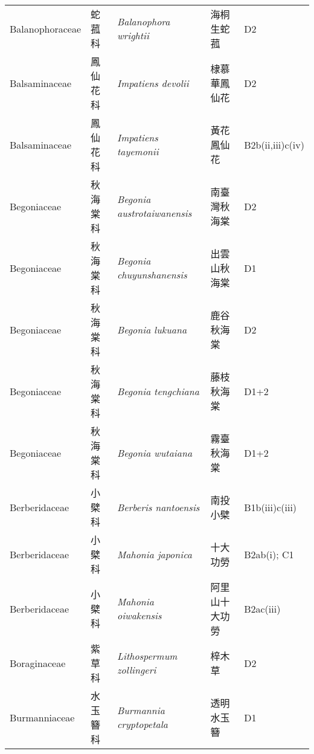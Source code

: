 {\begin{longtable}{p{2.5cm}p{2.5cm}p{4.5cm}p{2.5cm}p{3cm}}
    Balanophoraceae & 蛇菰科 & \textit{Balanophora wrightii}  & 海桐生蛇菰 & D2 \index{Balanophora@\textit{Balanophora}!wrightii@\textit{wrightii}}  \index{海桐生蛇菰} \\
    Balsaminaceae & 鳳仙花科 & \textit{Impatiens devolii}  & 棣慕華鳳仙花 & D2 \index{Impatiens@\textit{Impatiens}!devolii@\textit{devolii}}  \index{棣慕華鳳仙花} \\
    Balsaminaceae & 鳳仙花科 & \textit{Impatiens tayemonii}  & 黃花鳳仙花 & B2b(ii,iii)c(iv) \index{Impatiens@\textit{Impatiens}!tayemonii@\textit{tayemonii}}  \index{黃花鳳仙花} \\
    Begoniaceae & 秋海棠科 & \textit{Begonia austrotaiwanensis}  & 南臺灣秋海棠 & D2 \index{Begonia@\textit{Begonia}!austrotaiwanensis@\textit{austrotaiwanensis}}  \index{南臺灣秋海棠} \\
    Begoniaceae & 秋海棠科 & \textit{Begonia chuyunshanensis}  & 出雲山秋海棠 & D1 \index{Begonia@\textit{Begonia}!chuyunshanensis@\textit{chuyunshanensis}}  \index{出雲山秋海棠} \\
    Begoniaceae & 秋海棠科 & \textit{Begonia lukuana}  & 鹿谷秋海棠 & D2 \index{Begonia@\textit{Begonia}!lukuana@\textit{lukuana}}  \index{鹿谷秋海棠} \\
    Begoniaceae & 秋海棠科 & \textit{Begonia tengchiana}  & 藤枝秋海棠 & D1+2 \index{Begonia@\textit{Begonia}!tengchiana@\textit{tengchiana}}  \index{藤枝秋海棠} \\
    Begoniaceae & 秋海棠科 & \textit{Begonia wutaiana}  & 霧臺秋海棠 & D1+2 \index{Begonia@\textit{Begonia}!wutaiana@\textit{wutaiana}}  \index{霧臺秋海棠} \\
    Berberidaceae & 小檗科 & \textit{Berberis nantoensis}  & 南投小檗 & B1b(iii)c(iii) \index{Berberis@\textit{Berberis}!nantoensis@\textit{nantoensis}}  \index{南投小檗} \\
    Berberidaceae & 小檗科 & \textit{Mahonia japonica}  & 十大功勞 & B2ab(i); C1 \index{Mahonia@\textit{Mahonia}!japonica@\textit{japonica}}  \index{十大功勞} \\
    Berberidaceae & 小檗科 & \textit{Mahonia oiwakensis}  & 阿里山十大功勞 & B2ac(iii) \index{Mahonia@\textit{Mahonia}!oiwakensis@\textit{oiwakensis}}  \index{阿里山十大功勞} \\
    Boraginaceae & 紫草科 & \textit{Lithospermum zollingeri}  & 梓木草 & D2 \index{Lithospermum@\textit{Lithospermum}!zollingeri@\textit{zollingeri}}  \index{梓木草} \\
    Burmanniaceae & 水玉簪科 & \textit{Burmannia cryptopetala}  & 透明水玉簪 & D1 \index{Burmannia@\textit{Burmannia}!cryptopetala@\textit{cryptopetala}}  \index{透明水玉簪} \\

\end{longtable}}
